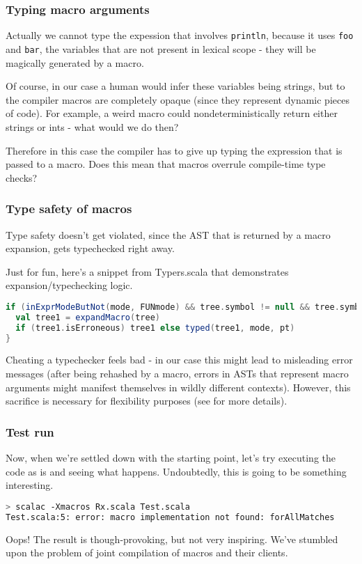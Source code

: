 \documentclass[hyperref={bookmarks=false}]{beamer}
\begin{document}
\begin{frame}[t,fragile]
\frametitle{Typing macro arguments}

Actually we cannot type the expession that involves \texttt{println}, because it uses \texttt{foo} and \texttt{bar}, the variables that are not present in lexical scope - they will be magically generated by a macro.

Of course, in our case a human would infer these variables being strings, but to the compiler macros are completely opaque (since they represent dynamic pieces of code). For example, a weird macro could nondeterministically return either strings or ints - what would we do then?

Therefore in this case the compiler has to give up typing the expression that is passed to a macro. Does this mean that macros overrule compile-time type checks?
\end{frame}


\begin{frame}[t,fragile]
\frametitle{Type safety of macros}

Type safety doesn't get violated, since the AST that is returned by a macro expansion, gets typechecked right away.

Just for fun, here's a snippet from Typers.scala that demonstrates expansion/typechecking logic.
\begin{lstlisting}[language=scala]
if (inExprModeButNot(mode, FUNmode) && tree.symbol != null && tree.symbol.isMacro && !tree.isDef) {
  val tree1 = expandMacro(tree)
  if (tree1.isErroneous) tree1 else typed(tree1, mode, pt)
}
\end{lstlisting}

Cheating a typechecker feels bad - in our case this might lead to misleading error messages (after being rehashed by a macro, errors in ASTs that represent macro arguments might manifest themselves in wildly different contexts). However, this sacrifice is necessary for flexibility purposes (see  for more details).
\end{frame}

\begin{frame}[t,fragile]
\frametitle{Test run}
Now, when we're settled down with the starting point, let's try executing the code as is and seeing what happens. Undoubtedly, this is going to be something interesting.

\begin{lstlisting}[language=bash]
> scalac -Xmacros Rx.scala Test.scala
Test.scala:5: error: macro implementation not found: forAllMatches
\end{lstlisting}

Oops! The result is though-provoking, but not very inspiring. We've stumbled upon the problem of joint compilation of macros and their clients.
\end{frame}
\end{document}
